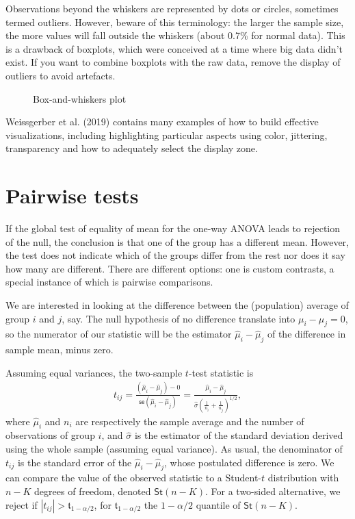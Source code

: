 \documentclass[
  11pt,
  letterpaper,
]{scrbook}
\theoremstyle{definition}
\theoremstyle{definition}
\theoremstyle{remark}
\begin{document}
Observations beyond the whiskers are represented by dots or circles,
sometimes termed outliers. However, beware of this terminology: the
larger the sample size, the more values will fall outside the whiskers
(about 0.7\% for normal data). This is a drawback of boxplots, which
were conceived at a time where big data didn't exist. If you want to
combine boxplots with the raw data, remove the display of outliers to
avoid artefacts.

\begin{figure}[ht!]


\caption{\label{fig-boxplot}Box-and-whiskers plot}

\end{figure}%

Weissgerber et al. (2019) contains many examples of how to build
effective visualizations, including highlighting particular aspects
using color, jittering, transparency and how to adequately select the
display zone.

\section{Pairwise tests}\label{pairwise-tests}

If the global test of equality of mean for the one-way ANOVA leads to
rejection of the null, the conclusion is that one of the group has a
different mean. However, the test does not indicate which of the groups
differ from the rest nor does it say how many are different. There are
different options: one is custom contrasts, a special instance of which
is pairwise comparisons.

We are interested in looking at the difference between the (population)
average of group \(i\) and \(j\), say. The null hypothesis of no
difference translate into \(\mu_i-\mu_j=0\), so the numerator of our
statistic will be the estimator \(\widehat{\mu}_i - \widehat{\mu}_j\) of
the difference in sample mean, minus zero.

Assuming equal variances, the two-sample \(t\)-test statistic is
\begin{align*}
t_{ij} = \frac{(\widehat{\mu}_i - \widehat{\mu}_j) - 0}{\mathsf{se}(\widehat{\mu}_i - \widehat{\mu}_j)} =\frac{\widehat{\mu}_i - \widehat{\mu}_j}{\widehat{\sigma} \left(\frac{1}{n_i} + \frac{1}{n_j}\right)^{1/2}},
\end{align*} where \(\widehat{\mu}_i\) and \(n_i\) are respectively the
sample average and the number of observations of group \(i\), and
\(\widehat{\sigma}\) is the estimator of the standard deviation derived
using the whole sample (assuming equal variance). As usual, the
denominator of \(t_{ij}\) is the standard error of the
\(\widehat{\mu}_i - \widehat{\mu}_j\), whose postulated difference is
zero. We can compare the value of the observed statistic to a
Student-\(t\) distribution with \(n-K\) degrees of freedom, denoted
\(\mathsf{St}(n-K)\). For a two-sided alternative, we reject if
\(|t_{ij}| > \mathfrak{t}_{1-\alpha/2}\), for
\(\mathfrak{t}_{1-\alpha/2}\) the \(1-\alpha/2\) quantile of
\(\mathsf{St}(n-K)\).
\end{document}
